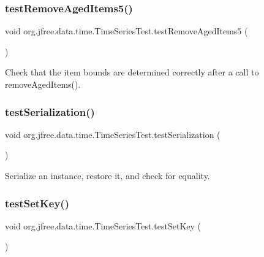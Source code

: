 \subsubsection{\texorpdfstring{test\+Remove\+Aged\+Items5()}{testRemoveAgedItems5()}}
{\footnotesize\ttfamily void org.\+jfree.\+data.\+time.\+Time\+Series\+Test.\+test\+Remove\+Aged\+Items5 (\begin{DoxyParamCaption}{ }\end{DoxyParamCaption})}

Check that the item bounds are determined correctly after a call to remove\+Aged\+Items(). \mbox{\label{classorg_1_1jfree_1_1data_1_1time_1_1_time_series_test_ab336cbca1abb0f060997a5b04cc3d12a}} 
\subsubsection{\texorpdfstring{test\+Serialization()}{testSerialization()}}
{\footnotesize\ttfamily void org.\+jfree.\+data.\+time.\+Time\+Series\+Test.\+test\+Serialization (\begin{DoxyParamCaption}{ }\end{DoxyParamCaption})}

Serialize an instance, restore it, and check for equality. \mbox{\label{classorg_1_1jfree_1_1data_1_1time_1_1_time_series_test_a984f4bb465fb03fa8cb5f20d621d472e}} 
\subsubsection{\texorpdfstring{test\+Set\+Key()}{testSetKey()}}
{\footnotesize\ttfamily void org.\+jfree.\+data.\+time.\+Time\+Series\+Test.\+test\+Set\+Key (\begin{DoxyParamCaption}{ }\end{DoxyParamCaption})}

